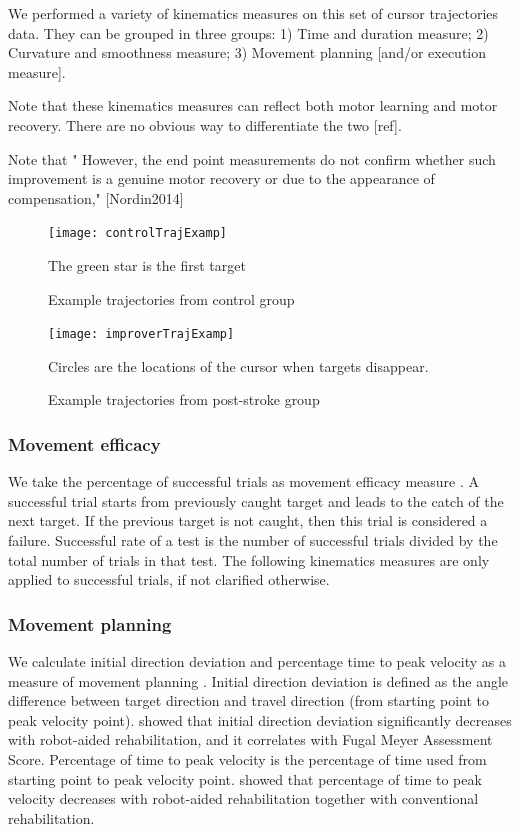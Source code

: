 We performed a variety of kinematics measures on this set of cursor trajectories data. 
They can be grouped in three groups: 1) Time and duration measure; 2) Curvature and smoothness measure; 3) Movement planning [and/or execution measure]. 

Note that these kinematics measures can reflect both motor learning and motor recovery. There are no obvious way to differentiate the two [ref].

Note that "
However, the end point measurements do not confirm whether such improvement is a genuine motor recovery or due to the appearance of compensation," [Nordin2014]



\begin{figure}
	\texttt{[image: controlTrajExamp]}
	\centering
	\caption{Example trajectories from control group}
	\medskip
	\small The green star is the first target
	\label{fig:controlTrajExamp}
\end{figure}

\begin{figure}
	\texttt{[image: improverTrajExamp]}
	\centering
	\caption{Example trajectories from post-stroke group}
	\medskip
	\small Circles are the locations of the cursor when targets disappear.
	\label{fig:improverTrajExamp}
\end{figure}

\subsubsection{Movement efficacy}
We take the percentage of successful trials as movement efficacy measure \cite{Nordin2014}. 
A successful trial starts from previously caught target and leads to the catch of the next target. 
If the previous target is not caught, then this trial is considered a failure.
Successful rate of a test is the number of successful trials divided by the total number of trials in that test.
The following kinematics measures are only applied to successful trials, if not clarified otherwise.

\subsubsection{Movement planning}
We calculate initial direction deviation and percentage time to peak velocity as a measure of movement planning \cite{Nordin2014}. 
Initial direction deviation is defined as the angle difference between target direction and travel direction (from starting point to peak velocity point).
\cite{Zollo2011} showed that initial direction deviation significantly decreases with robot-aided rehabilitation, and it correlates with Fugal Meyer Assessment Score.
Percentage of time to peak velocity is the percentage of time used from starting point to peak velocity point.
\cite{Chang2007} showed that percentage of time to peak velocity decreases with robot-aided rehabilitation together with conventional rehabilitation.

